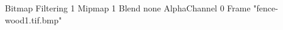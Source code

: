 {Bitmap
	{Filtering 1}
	{Mipmap 1}
	{Blend none}
	{AlphaChannel 0}
	{Frame "fence-wood1.tif.bmp"}
}
